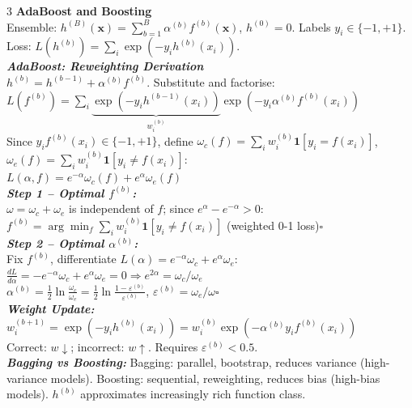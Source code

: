 \documentclass[a4paper,7pt]{article}
\begin{document}
\begin{multicols*}{3}
\textbf{AdaBoost and Boosting}\\
Ensemble: $h^{(B)}(\mathbf{x})=\sum_{b=1}^B\alpha^{(b)}f^{(b)}(\mathbf{x})$, $h^{(0)}=0$. Labels $y_i\in\{-1,+1\}$.\\
Loss: $L(h^{(b)})=\sum_i\exp(-y_i h^{(b)}(x_i))$.\\

\textit{\textbf{AdaBoost: Reweighting Derivation}}\\
$h^{(b)}=h^{(b-1)}+\alpha^{(b)}f^{(b)}$. Substitute and factorise:\\
$L(f^{(b)})=\sum_i\underbrace{\exp(-y_i h^{(b-1)}(x_i))}_{w_i^{(b)}}\exp(-y_i\alpha^{(b)}f^{(b)}(x_i))$\\
Since $y_i f^{(b)}(x_i)\in\{-1,+1\}$, define $\omega_c(f)=\sum_i w_i^{(b)}\mathbf{1}[y_i=f(x_i)]$, $\omega_e(f)=\sum_i w_i^{(b)}\mathbf{1}[y_i\neq f(x_i)]$:\\
$L(\alpha,f)=e^{-\alpha}\omega_c(f)+e^{\alpha}\omega_e(f)$\\

\textit{\textbf{Step 1 -- Optimal $f^{(b)}$:}}\\$\omega=\omega_c+\omega_e$ is independent of $f$; since $e^\alpha-e^{-\alpha}>0$:\\
$f^{(b)}=\arg\min_f\sum_i w_i^{(b)}\mathbf{1}[y_i\neq f(x_i)]$ (weighted 0-1 loss)\hfill$\square$\\

\textit{\textbf{Step 2 -- Optimal $\alpha^{(b)}$:}}\\ Fix $f^{(b)}$, differentiate $L(\alpha)=e^{-\alpha}\omega_c+e^\alpha\omega_e$:\\
$\frac{dL}{d\alpha}=-e^{-\alpha}\omega_c+e^\alpha\omega_e=0\Rightarrow e^{2\alpha}=\omega_c/\omega_e$\\
$\alpha^{(b)}=\frac{1}{2}\ln\frac{\omega_c}{\omega_e}=\frac{1}{2}\ln\frac{1-\varepsilon^{(b)}}{\varepsilon^{(b)}}$, $\varepsilon^{(b)}=\omega_e/\omega$\hfill$\square$\\

\textit{\textbf{Weight Update:}}\\ $w_i^{(b+1)}=\exp(-y_i h^{(b)}(x_i))=w_i^{(b)}\exp(-\alpha^{(b)}y_if^{(b)}(x_i))$\\
Correct: $w\downarrow$; incorrect: $w\uparrow$. Requires $\varepsilon^{(b)}<0.5$.\\

\textit{\textbf{Bagging vs Boosting:}} Bagging: parallel, bootstrap, reduces variance (high-variance models). Boosting: sequential, reweighting, reduces bias (high-bias models). $h^{(b)}$ approximates increasingly rich function class.\\


\end{multicols*}
\end{document}
